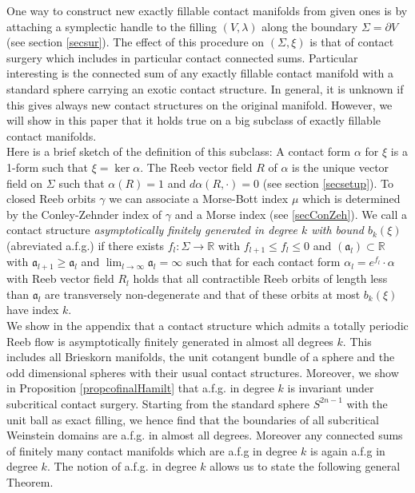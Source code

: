 \documentclass[a4paper,12pt,bibliography=totocnumbered,titlepage=false,abstracton,bookmarksnumbered=true]{scrartcl}
\theoremstyle{definition}
\begin{document}
One way to construct new exactly fillable contact manifolds from given ones is by attaching a symplectic handle to the filling $(V,\lambda)$ along the boundary $\Sigma=\partial V$ (see section \ref{secsur}). The effect of this procedure on $(\Sigma,\xi)$ is that of contact surgery which includes in particular contact connected sums. Particular interesting is the connected sum of any exactly fillable contact manifold with a standard sphere carrying an exotic contact structure. In general, it is unknown if this gives always new contact structures on the original manifold. However, we will show in this paper that it holds true on a big subclass of exactly fillable contact manifolds.\\
Here is a brief sketch of the definition of this subclass: A contact form $\alpha$ for $\xi$ is a 1-form such that $\xi=\ker\alpha$. The Reeb vector field $R$ of $\alpha$ is the unique vector field on $\Sigma$ such that $\alpha(R)=1$ and $d\alpha(R,\cdot)=0$ (see section \ref{secsetup}). To closed Reeb orbits $\gamma$ we can associate a Morse-Bott index $\mu$ which is determined by the Conley-Zehnder index of $\gamma$ and a Morse index (see \ref{secConZeh}). We call a contact structure \emph{asymptotically finitely generated in degree $k$ with bound $b_k(\xi)$} (abreviated a.f.g.) if there exists $f_l:\Sigma\rightarrow \mathbb{R}$ with $f_{l+1}\leq f_l\leq 0$ and $(\mathfrak{a}_l)\subset\mathbb{R}$ with $\mathfrak{a}_{l+1}\geq\mathfrak{a}_l$ and $\lim_{l\rightarrow\infty}\mathfrak{a}_l=\infty$ such that for each contact form $\alpha_l=e^{f_l}{\cdot}\alpha$ with Reeb vector field $R_l$ holds that all contractible Reeb orbits of length less than $\mathfrak{a}_l$ are transversely non-degenerate and that of these orbits at most $b_k(\xi)$ have index $k$.\\
We show in the appendix that a contact structure which admits a totally periodic Reeb flow is asymptotically finitely generated in almost all degrees $k$. This includes all Brieskorn manifolds, the unit cotangent bundle of a sphere and the odd dimensional spheres with their usual contact structures. Moreover, we show in Proposition \ref{propcofinalHamilt} that a.f.g. in degree $k$ is invariant under subcritical contact surgery. Starting from the standard sphere $S^{2n-1}$ with the unit ball as exact filling, we hence find that the boundaries of all subcritical Weinstein domains are a.f.g. in almost all degrees. Moreover any connected sums of finitely many contact manifolds which are a.f.g in degree $k$ is again a.f.g in degree $k$. The notion of a.f.g. in degree $k$ allows us to state the following general Theorem.
\end{document}
